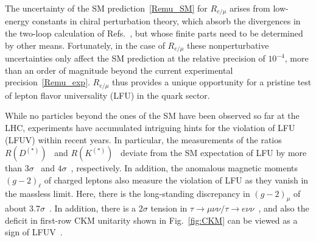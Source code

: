 The uncertainty of the SM prediction~\eqref{Remu_SM} for $R_{e/\mu}$ arises from low-energy constants in chiral perturbation theory, which absorb the divergences in the two-loop calculation of Refs.~\cite{Cirigliano1,Cirigliano2}, but whose finite parts need to be determined by other means. Fortunately, in the case of  $R_{e/\mu}$ these nonperturbative uncertainties only affect the SM prediction at the relative precision of $10^{-4}$, more than an order of magnitude beyond the current experimental precision~\eqref{Remu_exp}. $R_{e/\mu}$ thus provides a unique opportunity for a pristine test of lepton flavor universality (LFU) in the quark sector. 

While no particles beyond the ones of the SM have been observed so far at the LHC, experiments have accumulated intriguing hints for the violation of LFU (LFUV) within recent years. In particular, the measurements of the ratios $R(D^{(*)})$~\cite{Lees:2012xj,Aaij:2017deq,Abdesselam:2019dgh} and $R(K^{(*)})$~\cite{Aaij:2017vbb,Aaij:2019wad} deviate from the SM expectation of LFU by more than $3\sigma$~\cite{Amhis:2019ckw,Murgui:2019czp,Shi:2019gxi,Blanke:2019qrx,Kumbhakar:2019avh} and $4\sigma$~\cite{Alguero:2019ptt,Aebischer:2019mlg,Ciuchini:2019usw,Arbey:2019duh}, respectively. In addition, the anomalous magnetic moments $(g-2)_\ell$ of charged leptons also measure the violation of LFU as they vanish in the massless limit. Here, there is the long-standing discrepancy in $(g-2)_\mu$ of about $3.7\sigma$~\cite{Bennett:2006fi,Aoyama:2020ynm}. In addition, there is a $2\sigma$ tension in $\tau\to\mu\nu\nu/\tau\to e\nu\nu$~\cite{Aoki:2019cca}, and also the deficit in first-row CKM unitarity shown in Fig.~\ref{fig:CKM}  can be viewed as a sign of LFUV~\cite{Crivellin:2020lzu}. 


